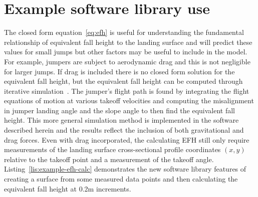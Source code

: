 \documentclass[smallextended]{svjour3}       %
\begin{document}
\section{Example software library use}
\label{sec:example}
%
The closed form equation~\ref{eq:efh} is useful for understanding the
fundamental relationship of equivalent fall height to the landing surface and
will predict these values for small jumps but other factors may be useful to
include in the model. For example, jumpers are subject to aerodynamic drag and
this is not negligible for larger jumps. If drag is included there is no closed
form solution for the equivalent fall height, but the equivalent fall height
can be computed through iterative simulation~\cite{Levy2015}. The jumper's
flight path is found by integrating the flight equations of motion at various
takeoff velocities and computing the misalignment in jumper landing angle and
the slope angle to then find the equivalent fall height. This more general
simulation method is implemented in the software described herein and the
results reflect the inclusion of both gravitational and drag forces. Even with
drag incorporated, the calculating EFH still only require measurements of the
landing surface cross-sectional profile coordinates $(x,y)$ relative to the
takeoff point and a measurement of the takeoff angle.
Listing~\ref{lis:example-efh-calc} demonstrates the new software library
features of creating a surface from some measured data points and then
calculating the equivalent fall height at 0.2\si{\meter} increments.
%
\end{document}
